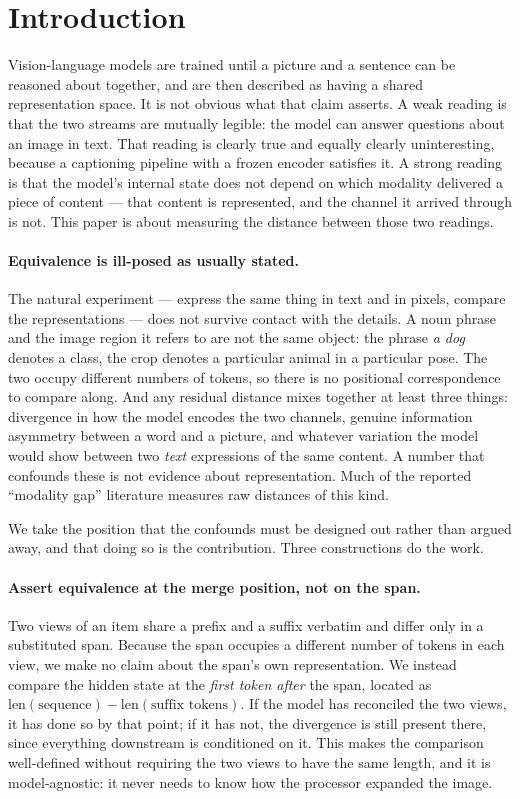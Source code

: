 \section{Introduction}

Vision-language models are trained until a picture and a sentence can be
reasoned about together, and are then described as having a shared
representation space. It is not obvious what that claim asserts. A weak reading
is that the two streams are mutually legible: the model can answer questions
about an image in text. That reading is clearly true and equally clearly
uninteresting, because a captioning pipeline with a frozen encoder satisfies it.
A strong reading is that the model's internal state does not depend on which
modality delivered a piece of content --- that content is represented, and the
channel it arrived through is not. This paper is about measuring the distance
between those two readings.

\paragraph{Equivalence is ill-posed as usually stated.}
The natural experiment --- express the same thing in text and in pixels, compare
the representations --- does not survive contact with the details. A noun phrase
and the image region it refers to are not the same object: the phrase
\emph{a dog} denotes a class, the crop denotes a particular animal in a
particular pose. The two occupy different numbers of tokens, so there is no
positional correspondence to compare along. And any residual distance mixes
together at least three things: divergence in how the model encodes the two
channels, genuine information asymmetry between a word and a picture, and
whatever variation the model would show between two \emph{text} expressions of
the same content. A number that confounds these is not evidence about
representation. Much of the reported ``modality gap'' literature measures raw
distances of this kind.

We take the position that the confounds must be designed out rather than
argued away, and that doing so is the contribution. Three constructions do the
work.

\paragraph{Assert equivalence at the merge position, not on the span.}
Two views of an item share a prefix and a suffix verbatim and differ only in a
substituted span. Because the span occupies a different number of tokens in each
view, we make no claim about the span's own representation. We instead compare
the hidden state at the \emph{first token after} the span, located as
$\text{len}(\text{sequence}) - \text{len}(\text{suffix tokens})$. If the model
has reconciled the two views, it has done so by that point; if it has not, the
divergence is still present there, since everything downstream is conditioned on
it. This makes the comparison well-defined without requiring the two views to
have the same length, and it is model-agnostic: it never needs to know how the
processor expanded the image.

